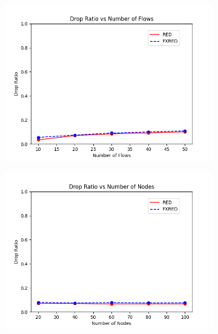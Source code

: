 \documentclass[10pt]{report}
\begin{document}
\begin{figure}
    \centering
    \begin{subfigure}{.5\textwidth}
        \includegraphics[width=1\linewidth]{static/graphs/wired/Drop Ratio vs Number of Flows.png}
    \end{subfigure}%
    \begin{subfigure}{.5\textwidth}
        \includegraphics[width=1\linewidth]{static/graphs/wired/Drop Ratio vs Number of Nodes.png}
    \end{subfigure}


\end{figure}
\end{document}
